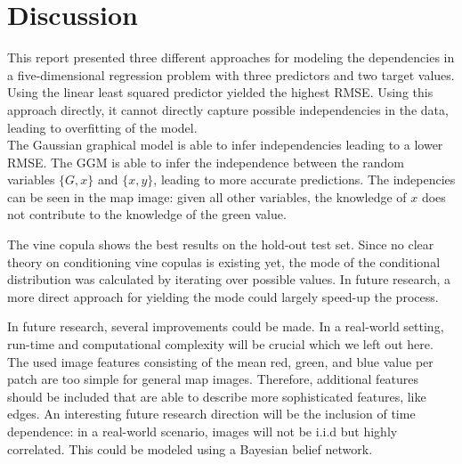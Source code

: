 \documentclass{article}
\begin{document}
\section{Discussion}
\label{sec:discussion}


This report presented three different approaches for modeling the
dependencies in a five-dimensional regression problem with three
predictors and two target values.\\
Using the linear least squared predictor yielded the highest
RMSE. Using this approach directly, it cannot directly capture
possible independencies in the data, leading to overfitting of the model.\\
The Gaussian graphical model is able to infer independencies leading
to a lower RMSE. The GGM is able to infer the independence between the
random variables $\{G, x\}$ and $\{x, y\}$, leading to more accurate
predictions. The indepencies can be seen in the map image: given all
other variables, the knowledge of $x$ does not contribute to the
knowledge of the green value.

The vine copula shows the best results on the hold-out test set. Since
no clear theory on conditioning vine copulas is existing yet, the mode
of the conditional distribution was calculated by iterating over
possible values. In future research, a more direct approach for
yielding the mode could largely speed-up the process.


In future research, several improvements could be made. In a
real-world setting, run-time and computational complexity will be
crucial which we left out here. The used image features consisting of
the mean red, green, and blue value per patch are too simple for
general map images. Therefore, additional features should be included
that are able to describe more sophisticated features, like edges. An
interesting future research direction will be the inclusion of time
dependence: in a real-world scenario, images will not be i.i.d but
highly correlated. This could be modeled using a Bayesian belief
network.


\end{document}
